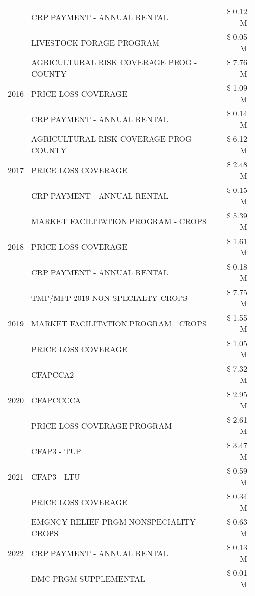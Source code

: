 \begin{tabular}{llr}
 & CRP PAYMENT - ANNUAL RENTAL & \$ 0.12 M \\
 & LIVESTOCK FORAGE PROGRAM & \$ 0.05 M \\
\cline{1-3}
\multirow[t]{3}{*}{2016} & AGRICULTURAL RISK COVERAGE PROG - COUNTY & \$ 7.76 M \\
 & PRICE LOSS COVERAGE & \$ 1.09 M \\
 & CRP PAYMENT - ANNUAL RENTAL & \$ 0.14 M \\
\cline{1-3}
\multirow[t]{3}{*}{2017} & AGRICULTURAL RISK COVERAGE PROG - COUNTY & \$ 6.12 M \\
 & PRICE LOSS COVERAGE & \$ 2.48 M \\
 & CRP PAYMENT - ANNUAL RENTAL & \$ 0.15 M \\
\cline{1-3}
\multirow[t]{3}{*}{2018} & MARKET FACILITATION PROGRAM - CROPS & \$ 5.39 M \\
 & PRICE LOSS COVERAGE & \$ 1.61 M \\
 & CRP PAYMENT - ANNUAL RENTAL & \$ 0.18 M \\
\cline{1-3}
\multirow[t]{3}{*}{2019} & TMP/MFP 2019 NON SPECIALTY CROPS & \$ 7.75 M \\
 & MARKET FACILITATION PROGRAM - CROPS & \$ 1.55 M \\
 & PRICE LOSS COVERAGE & \$ 1.05 M \\
\cline{1-3}
\multirow[t]{3}{*}{2020} & CFAPCCA2 & \$ 7.32 M \\
 & CFAPCCCCA & \$ 2.95 M \\
 & PRICE LOSS COVERAGE PROGRAM & \$ 2.61 M \\
\cline{1-3}
\multirow[t]{3}{*}{2021} & CFAP3 - TUP & \$ 3.47 M \\
 & CFAP3 - LTU & \$ 0.59 M \\
 & PRICE LOSS COVERAGE & \$ 0.34 M \\
\cline{1-3}
\multirow[t]{3}{*}{2022} & EMGNCY RELIEF PRGM-NONSPECIALITY CROPS & \$ 0.63 M \\
 & CRP PAYMENT - ANNUAL RENTAL & \$ 0.13 M \\
 & DMC PRGM-SUPPLEMENTAL & \$ 0.01 M \\
\cline{1-3}
\bottomrule
\end{tabular}
